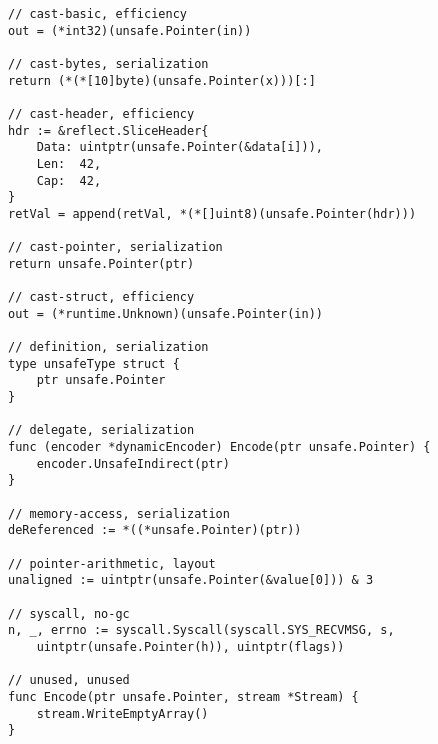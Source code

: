 \begin{lstlisting}[language=Golang, label=lst:dataset-label-class-examples, caption=Example code snippets for different classes in the data set]
// cast-basic, efficiency
out = (*int32)(unsafe.Pointer(in))

// cast-bytes, serialization
return (*(*[10]byte)(unsafe.Pointer(x)))[:]

// cast-header, efficiency
hdr := &reflect.SliceHeader{
    Data: uintptr(unsafe.Pointer(&data[i])),
    Len:  42,
    Cap:  42,
}
retVal = append(retVal, *(*[]uint8)(unsafe.Pointer(hdr)))

// cast-pointer, serialization
return unsafe.Pointer(ptr)

// cast-struct, efficiency
out = (*runtime.Unknown)(unsafe.Pointer(in))

// definition, serialization
type unsafeType struct {
    ptr unsafe.Pointer
}

// delegate, serialization
func (encoder *dynamicEncoder) Encode(ptr unsafe.Pointer) {
    encoder.UnsafeIndirect(ptr)
}

// memory-access, serialization
deReferenced := *((*unsafe.Pointer)(ptr))

// pointer-arithmetic, layout
unaligned := uintptr(unsafe.Pointer(&value[0])) & 3

// syscall, no-gc
n, _, errno := syscall.Syscall(syscall.SYS_RECVMSG, s,
    uintptr(unsafe.Pointer(h)), uintptr(flags))

// unused, unused
func Encode(ptr unsafe.Pointer, stream *Stream) {
    stream.WriteEmptyArray()
}
\end{lstlisting}